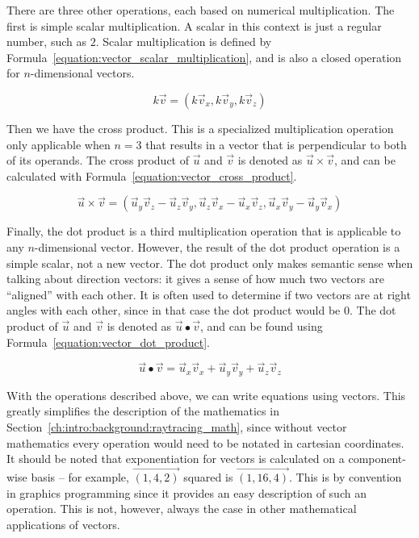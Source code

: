 There are three other operations, each based on numerical multiplication.
The first is simple scalar multiplication.
A scalar in this context is just a regular number, such as $2$.
Scalar multiplication is defined by Formula~\ref{equation:vector_scalar_multiplication}, and is also a closed operation for $n$-dimensional vectors.

\begin{equation}
  \label{equation:vector_scalar_multiplication}
  k\vec{v} = (k\vec{v}_x, k\vec{v}_y, k\vec{v}_z)
\end{equation}

Then we have the cross product.
This is a specialized multiplication operation only applicable when $n = 3$ that results in a vector that is perpendicular to both of its operands.
The cross product of $\vec{u}$ and $\vec{v}$ is denoted as $\vec{u} \times \vec{v}$, and can be calculated with Formula~\ref{equation:vector_cross_product}.

\begin{equation}
  \label{equation:vector_cross_product}
  \vec{u} \times \vec{v} = (\vec{u}_y\vec{v}_z - \vec{u}_z\vec{v}_y, \vec{u}_z\vec{v}_x - \vec{u}_x\vec{v}_z, \vec{u}_x\vec{v}_y - \vec{u}_y\vec{v}_x)
\end{equation}

Finally, the dot product is a third multiplication operation that is applicable to any $n$-dimensional vector.
However, the result of the dot product operation is a simple scalar, not a new vector.
The dot product only makes semantic sense when talking about direction vectors: it gives a sense of how much two vectors are ``aligned'' with each other.
It is often used to determine if two vectors are at right angles with each other, since in that case the dot product would be $0$.
The dot product of $\vec{u}$ and $\vec{v}$ is denoted as $\vec{u} \bullet \vec{v}$, and can be found using Formula~\ref{equation:vector_dot_product}.

\begin{equation}
  \label{equation:vector_dot_product}
  \vec{u} \bullet \vec{v} = \vec{u}_x\vec{v}_x + \vec{u}_y\vec{v}_y + \vec{u}_z\vec{v}_z
\end{equation}


With the operations described above, we can write equations using vectors.
This greatly simplifies the description of the mathematics in Section~\ref{ch:intro:background:raytracing_math}, since without vector mathematics every operation would need to be notated in cartesian coordinates.
It should be noted that exponentiation for vectors is calculated on a component-wise basis -- for example, $\vec{(1, 4, 2)}$ squared is $\vec{(1, 16, 4)}$.
This is by convention in graphics programming since it provides an easy description of such an operation.
This is not, however, always the case in other mathematical applications of vectors.

